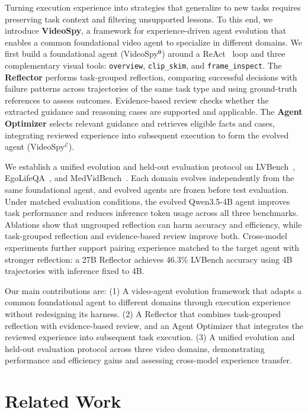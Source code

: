 \documentclass{article} %
\begin{document}
Turning execution experience into strategies that generalize to new tasks requires preserving task context and filtering unsupported lessons.
To this end, we introduce \textbf{VideoSpy}, a framework for experience-driven agent evolution that enables a common foundational video agent to specialize in different domains. We first build a foundational agent (VideoSpy$^{\mathbf{0}}$) around a ReAct~\citep{yao2023react} loop and three complementary visual tools: \texttt{overview}, \texttt{clip\_skim}, and \texttt{frame\_inspect}. The \textbf{Reflector} performs task-grouped reflection, comparing successful decisions with failure patterns across trajectories of the same task type and using ground-truth references to assess outcomes. Evidence-based review checks whether the extracted guidance and reasoning cases are supported and applicable. The \textbf{Agent Optimizer} selects relevant guidance and retrieves eligible facts and cases, integrating reviewed experience into subsequent execution to form the evolved agent (VideoSpy$^{\mathcal{E}}$).

We establish a unified evolution and held-out evaluation protocol on LVBench~\citep{wang2025lvbench}, EgoLifeQA~\citep{yang2025egolife}, and MedVidBench~\citep{su2026medgrpo}. Each domain evolves independently from the same foundational agent, and evolved agents are frozen before test evaluation. Under matched evaluation conditions, the evolved Qwen3.5-4B agent improves task performance and reduces inference token usage across all three benchmarks. Ablations show that ungrouped reflection can harm accuracy and efficiency, while task-grouped reflection and evidence-based review improve both. Cross-model experiments further support pairing experience matched to the target agent with stronger reflection: a 27B Reflector achieves 46.3\% LVBench accuracy using 4B trajectories with inference fixed to 4B.

Our main contributions are: (1) A video-agent evolution framework that adapts a common foundational agent to different domains through execution experience without redesigning its harness.
(2) A Reflector that combines task-grouped reflection with evidence-based review, and an Agent Optimizer that integrates the reviewed experience into subsequent task execution.
(3) A unified evolution and held-out evaluation protocol across three video domains, demonstrating performance and efficiency gains and assessing cross-model experience transfer.


\section{Related Work}
\end{document}
